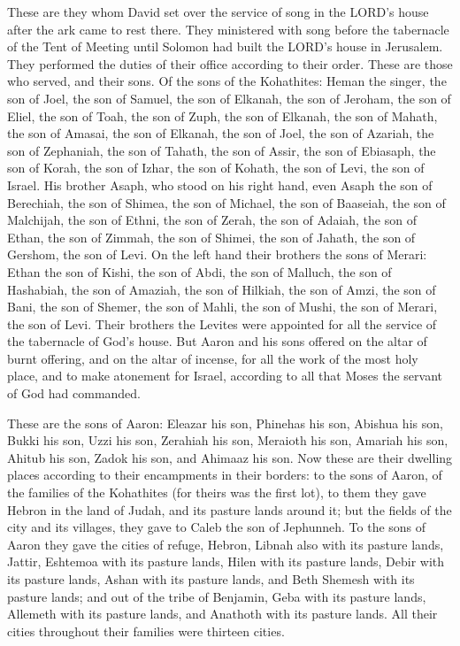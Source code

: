 \myverse{}These are they whom David set over the service of song in the
LORD’s house after the ark came to rest there.
\myverse{}They ministered with song before the tabernacle of the Tent of Meeting until
Solomon had built the LORD’s house in Jerusalem. They performed the duties of their office according to
their order.
\myverse{}These are those who served, and their sons. Of the sons of the Kohathites:
Heman the singer, the son of Joel, the son of Samuel,
\myverse{}the son of Elkanah, the son of Jeroham, the son of Eliel, the son of Toah,
\myverse{}the son of Zuph, the son of Elkanah, the son of Mahath, the son of Amasai,
\myverse{}the son of Elkanah, the son of Joel, the son of Azariah, the son of Zephaniah,
\myverse{}the son of Tahath, the son of Assir, the son of Ebiasaph, the son of Korah,
\myverse{}the son of Izhar, the son of Kohath, the son of Levi, the son of Israel.
\myverse{}His brother Asaph, who stood on his right hand, even Asaph the son of Berechiah,
the son of Shimea,
\myverse{}the son of Michael, the son of Baaseiah, the son of Malchijah,
\myverse{}the son of Ethni, the son of Zerah, the son of Adaiah,
\myverse{}the son of Ethan, the son of Zimmah, the son of Shimei,
\myverse{}the son of Jahath, the son of Gershom, the son of Levi.
\myverse{}On the left hand their brothers the sons of Merari: Ethan the son of Kishi,
the son of Abdi, the son of Malluch,
\myverse{}the son of Hashabiah, the son of Amaziah, the son of Hilkiah,
\myverse{}the son of Amzi, the son of Bani, the son of Shemer,
\myverse{}the son of Mahli, the son of Mushi, the son of Merari, the son of Levi.
\myverse{}Their brothers the Levites were appointed for all the service of the tabernacle
of God’s house.
\myverse{}But Aaron and his sons offered on the altar of burnt offering, and on the
altar of incense, for all the work of the most holy place, and to make atonement for Israel, according
to all that Moses the servant of God had commanded.

\myverse{}These are the sons of Aaron: Eleazar his son, Phinehas his son,
Abishua his son,
\myverse{}Bukki his son, Uzzi his son, Zerahiah his son,
\myverse{}Meraioth his son, Amariah his son, Ahitub his son,
\myverse{}Zadok his son, and Ahimaaz his son.
\myverse{}Now these are their dwelling places according to their encampments in their
borders: to the sons of Aaron, of the families of the Kohathites (for theirs was the first lot),
\myverse{}to them they gave Hebron in the land of Judah, and its pasture lands around
it;
\myverse{}but the fields of the city and its villages, they gave to Caleb the son of
Jephunneh.
\myverse{}To the sons of Aaron they gave the cities of refuge, Hebron, Libnah also with
its pasture lands, Jattir, Eshtemoa with its pasture lands,
\myverse{}Hilen with its pasture lands, Debir with its pasture lands,
\myverse{}Ashan with its pasture lands, and Beth Shemesh with its pasture lands;
\myverse{}and out of the tribe of Benjamin, Geba with its pasture lands, Allemeth with
its pasture lands, and Anathoth with its pasture lands. All their cities throughout their families were
thirteen cities.

